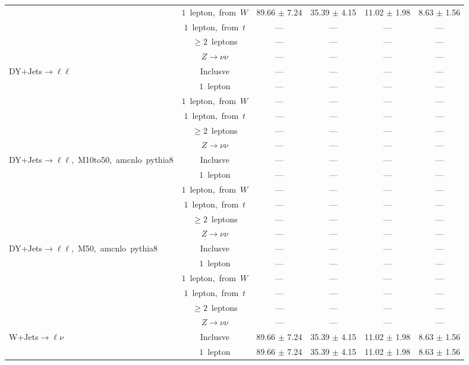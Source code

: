 \documentclass{article}
\begin{document}
\begin{longtable}{|l|c|c|c|c|c|}
 & $1$~lepton,~from~$W$  & 89.66 $\pm$ 7.24  & 35.39 $\pm$ 4.15  & 11.02 $\pm$ 1.98  & 8.63 $\pm$ 1.56 \\* 
 & $1$~lepton,~from~$t$  & ---  & ---  & ---  & --- \\* 
 & $\ge2$~leptons  & ---  & ---  & ---  & --- \\* 
 & $Z\rightarrow\nu\nu$  & ---  & ---  & ---  & --- \\* 
\hline 
\multirow{6}{*}{DY+Jets$\rightarrow\ell\ell$} & Inclusve  & ---  & ---  & ---  & --- \\* 
 & $1$~lepton  & ---  & ---  & ---  & --- \\* 
 & $1$~lepton,~from~$W$  & ---  & ---  & ---  & --- \\* 
 & $1$~lepton,~from~$t$  & ---  & ---  & ---  & --- \\* 
 & $\ge2$~leptons  & ---  & ---  & ---  & --- \\* 
 & $Z\rightarrow\nu\nu$  & ---  & ---  & ---  & --- \\* 
\hline 
\multirow{6}{*}{DY+Jets$\rightarrow\ell\ell$,~M10to50,~amcnlo~pythia8} & Inclusve  & ---  & ---  & ---  & --- \\* 
 & $1$~lepton  & ---  & ---  & ---  & --- \\* 
 & $1$~lepton,~from~$W$  & ---  & ---  & ---  & --- \\* 
 & $1$~lepton,~from~$t$  & ---  & ---  & ---  & --- \\* 
 & $\ge2$~leptons  & ---  & ---  & ---  & --- \\* 
 & $Z\rightarrow\nu\nu$  & ---  & ---  & ---  & --- \\* 
\hline 
\multirow{6}{*}{DY+Jets$\rightarrow\ell\ell$,~M50,~amcnlo~pythia8} & Inclusve  & ---  & ---  & ---  & --- \\* 
 & $1$~lepton  & ---  & ---  & ---  & --- \\* 
 & $1$~lepton,~from~$W$  & ---  & ---  & ---  & --- \\* 
 & $1$~lepton,~from~$t$  & ---  & ---  & ---  & --- \\* 
 & $\ge2$~leptons  & ---  & ---  & ---  & --- \\* 
 & $Z\rightarrow\nu\nu$  & ---  & ---  & ---  & --- \\* 
\hline 
\multirow{6}{*}{W+Jets$\rightarrow\ell\nu$} & Inclusve  & 89.66 $\pm$ 7.24  & 35.39 $\pm$ 4.15  & 11.02 $\pm$ 1.98  & 8.63 $\pm$ 1.56 \\* 
 & $1$~lepton  & 89.66 $\pm$ 7.24  & 35.39 $\pm$ 4.15  & 11.02 $\pm$ 1.98  & 8.63 $\pm$ 1.56 \\* 

\end{longtable}
\end{document}
